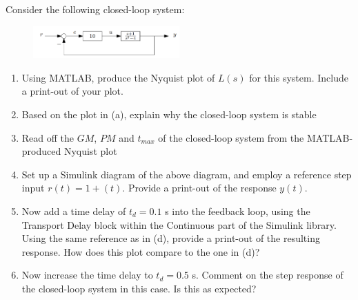 \section{}

Consider the following closed-loop system:
\begin{figure}[h]
    \centering
    \includegraphics[width=0.5\textwidth]{Questions/Figures/Q3ProblemDiagram.png}
\end{figure}
\begin{enumerate}[label=(\alph*)]
    \item Using MATLAB, produce the Nyquist plot of $L(s)$ for this system. Include a print-out of your plot.
    \item Based on the plot in (a), explain why the closed-loop system is stable
    \item Read off the $GM$, $PM$ and $t_{max}$ of the closed-loop system from the MATLAB-produced Nyquist plot
    \item Set up a Simulink diagram of the above diagram, and employ a reference step input $r(t) = 1+(t)$. Provide a print-out of the response $y(t)$.
    \item Now add a time delay of $t_d = 0.1$ s into the feedback loop, using the Transport Delay block within the Continuous part of the Simulink library. Using the same reference as in (d), provide a print-out of the resulting response. How does this plot compare to the one in (d)?
    \item Now increase the time delay to $t_d = 0.5$ s. Comment on the step response of the closed-loop system in this case. Is this as expected?
\end{enumerate}

